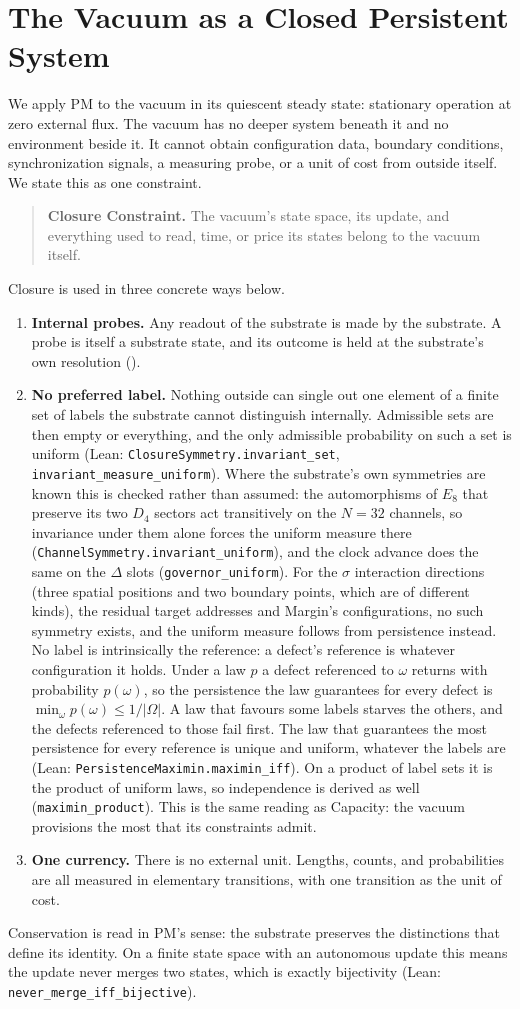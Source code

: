 \section{The Vacuum as a Closed Persistent System}
\label{sec:the_test_case}
We apply PM to the vacuum in its quiescent steady state: stationary operation at zero external flux. The vacuum has no deeper system beneath it and no environment beside it. It cannot obtain configuration data, boundary conditions, synchronization signals, a measuring probe, or a unit of cost from outside itself. We state this as one constraint.
\begin{quote}
\textbf{Closure Constraint.} The vacuum's state space, its update, and everything used to read, time, or price its states belong to the vacuum itself.
\end{quote}
\label{subsec:closure}
Closure is used in three concrete ways below.
\begin{enumerate}[label=(\roman*)]
\item \textbf{Internal probes.} Any readout of the substrate is made by the substrate. A probe is itself a substrate state, and its outcome is held at the substrate's own resolution ().
\item \textbf{No preferred label.} Nothing outside can single out one element of a finite set of labels the substrate cannot distinguish internally. Admissible sets are then empty or everything, and the only admissible probability on such a set is uniform (Lean: \texttt{ClosureSymmetry.invariant\_set}, \texttt{invariant\_measure\_uniform}). Where the substrate's own symmetries are known this is checked rather than assumed: the automorphisms of $E_8$ that preserve its two $D_4$ sectors act transitively on the $N=32$ channels, so invariance under them alone forces the uniform measure there (\texttt{ChannelSymmetry.invariant\_uniform}), and the clock advance does the same on the $\Delta$ slots (\texttt{governor\_uniform}). For the $\sigma$ interaction directions (three spatial positions and two boundary points, which are of different kinds), the residual target addresses and Margin's configurations, no such symmetry exists, and the uniform measure follows from persistence instead. No label is intrinsically the reference: a defect's reference is whatever configuration it holds. Under a law $p$ a defect referenced to $\omega$ returns with probability $p(\omega)$, so the persistence the law guarantees for every defect is $\min_\omega p(\omega)\le1/|\Omega|$. A law that favours some labels starves the others, and the defects referenced to those fail first. The law that guarantees the most persistence for every reference is unique and uniform, whatever the labels are (Lean: \texttt{PersistenceMaximin.maximin\_iff}). On a product of label sets it is the product of uniform laws, so independence is derived as well (\texttt{maximin\_product}). This is the same reading as Capacity: the vacuum provisions the most that its constraints admit.
\item \textbf{One currency.} There is no external unit. Lengths, counts, and probabilities are all measured in elementary transitions, with one transition as the unit of cost.
\end{enumerate}
Conservation is read in PM's sense: the substrate preserves the distinctions that define its identity. On a finite state space with an autonomous update this means the update never merges two states, which is exactly bijectivity (Lean: \texttt{never\_merge\_iff\_bijective}).
